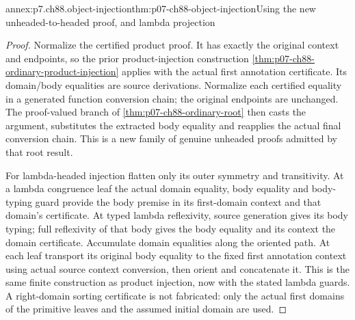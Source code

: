 \begin{annexitem}{annex:p7.ch88.object-injection}{thm:p07-ch88-object-injection}{Using the new unheaded-to-headed proof, and lambda projection}
\begin{proof}
Normalize the certified product proof. It has exactly the original
context and endpoints, so the prior product-injection construction
\cref{thm:p07-ch88-ordinary-product-injection} applies with the
actual first annotation certificate. Its domain/body equalities are
source derivations. Normalize each certified equality in a generated
function conversion chain; the original endpoints are unchanged.
The proof-valued branch of \cref{thm:p07-ch88-ordinary-root} then
casts the argument, substitutes the extracted body equality and
reapplies the actual final conversion chain. This is a new family
of genuine unheaded proofs admitted by that root result.

For lambda-headed injection flatten only its outer symmetry and
transitivity. At a lambda congruence leaf the actual domain equality,
body equality and body-typing guard provide the body premise in its
first-domain context and that domain's certificate. At typed lambda
reflexivity, source generation gives its body typing; full reflexivity
of that body gives the body equality and its context the domain
certificate. Accumulate domain equalities along the oriented path.
At each leaf transport its original body equality to the fixed first
annotation context using actual source context conversion, then orient
and concatenate it. This is the same finite construction as product
injection, now with the stated lambda guards. A right-domain sorting
certificate is not fabricated: only the actual first domains of the
primitive leaves and the assumed initial domain are used.
\end{proof}
\end{annexitem}

